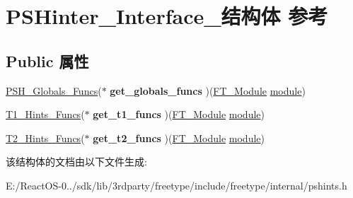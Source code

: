 \hypertarget{struct_p_s_hinter___interface__}{}\section{P\+S\+Hinter\+\_\+\+Interface\+\_\+结构体 参考}
\label{struct_p_s_hinter___interface__}
\subsection*{Public 属性}
\begin{DoxyCompactItemize}
\item 
\mbox{\label{struct_p_s_hinter___interface___a76e43921277f51cb28ac5f5ca5d4d849}} 
\hyperlink{struct_p_s_h___globals___funcs_rec__}{P\+S\+H\+\_\+\+Globals\+\_\+\+Funcs}($\ast$ {\bfseries get\+\_\+globals\+\_\+funcs} )(\hyperlink{struct_f_t___module_rec__}{F\+T\+\_\+\+Module} \hyperlink{structmodule}{module})
\item 
\mbox{\label{struct_p_s_hinter___interface___ae46a2b9590a09e77c7fa435e5e6d7cb4}} 
\hyperlink{struct_t1___hints___funcs_rec__}{T1\+\_\+\+Hints\+\_\+\+Funcs}($\ast$ {\bfseries get\+\_\+t1\+\_\+funcs} )(\hyperlink{struct_f_t___module_rec__}{F\+T\+\_\+\+Module} \hyperlink{structmodule}{module})
\item 
\mbox{\label{struct_p_s_hinter___interface___aff676c6c5e3ca1d266cdd2d4321b21f2}} 
\hyperlink{struct_t2___hints___funcs_rec__}{T2\+\_\+\+Hints\+\_\+\+Funcs}($\ast$ {\bfseries get\+\_\+t2\+\_\+funcs} )(\hyperlink{struct_f_t___module_rec__}{F\+T\+\_\+\+Module} \hyperlink{structmodule}{module})
\end{DoxyCompactItemize}


该结构体的文档由以下文件生成\+:\begin{DoxyCompactItemize}
\item 
E\+:/\+React\+O\+S-\/0../sdk/lib/3rdparty/freetype/include/freetype/internal/pshints.\+h\end{DoxyCompactItemize}
